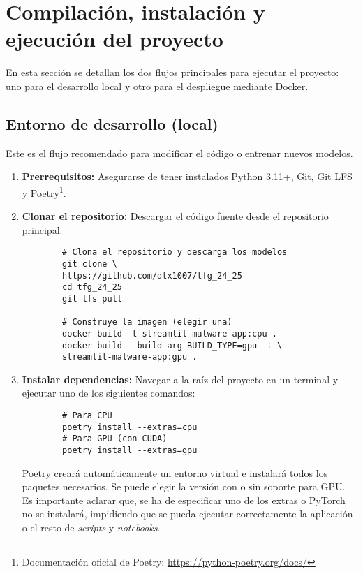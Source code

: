 \section{Compilación, instalación y ejecución del proyecto}
En esta sección se detallan los dos flujos principales para ejecutar el proyecto: uno para el desarrollo local y otro para el despliegue mediante Docker.

\subsection{Entorno de desarrollo (local)} \label{entorno_desarrollo}
Este es el flujo recomendado para modificar el código o entrenar nuevos modelos.
\begin{enumerate}
	\item \textbf{Prerrequisitos:} Asegurarse de tener instalados Python 3.11+, Git, Git LFS y Poetry\footnote{Documentación oficial de Poetry: \url{https://python-poetry.org/docs/}}.
	
	\item \textbf{Clonar el repositorio:} Descargar el código fuente desde el repositorio principal.
	
	\vspace*{-1em}
	\begin{verbatim}
		# Clona el repositorio y descarga los modelos
		git clone \
		https://github.com/dtx1007/tfg_24_25
		cd tfg_24_25
		git lfs pull
		
		# Construye la imagen (elegir una)
		docker build -t streamlit-malware-app:cpu .
		docker build --build-arg BUILD_TYPE=gpu -t \
		streamlit-malware-app:gpu .
	\end{verbatim}
	\vspace*{-1em}
	
	\newpage
	\item \textbf{Instalar dependencias:} Navegar a la raíz del proyecto en un terminal y ejecutar uno de los siguientes comandos:
	
	\vspace*{-1em}
	\begin{verbatim}
		# Para CPU
		poetry install --extras=cpu
		# Para GPU (con CUDA)
		poetry install --extras=gpu
	\end{verbatim}
	\vspace*{-1em}
	
	Poetry creará automáticamente un entorno virtual e instalará todos los paquetes necesarios. Se puede elegir la versión con o sin soporte para GPU. Es importante aclarar que, se ha de especificar uno de los extras o PyTorch no se instalará, impidiendo que se pueda ejecutar correctamente la aplicación o el resto de \textit{scripts} y \textit{notebooks}.


\end{enumerate}
